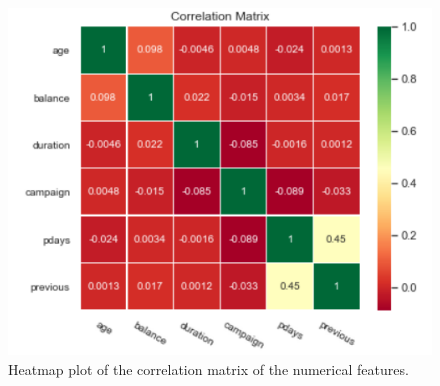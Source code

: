 \begin{figure}[tbh]
\centering
\includegraphics[width = 0.8\hsize]{./resources/img/fig_corr_matrix.png}
\caption{Heatmap plot of the correlation matrix of the numerical features.} 
\label{fig:corr_matrix}
\end{figure}








